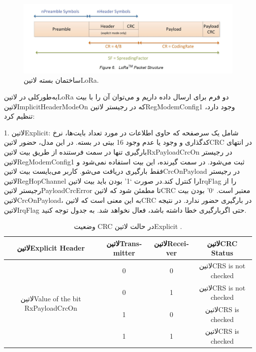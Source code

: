 \begin{figure}[!h]
	\centering
	\includegraphics[width=\linewidth]{Assets/lorapacket.png}
	\caption{ساختمان بسته ‌لاتین{LoRa}.}
	\label{fig:lorapacket}
\end{figure}
\noindent
به‌طورکلی در ‌لاتین{LoRa} دو فرم برای ارسال داده داریم و می‌توان آن را با بیت ‌لاتین{ImplicitHeaderModeOn} که در رجیستر ‌لاتین{RegModemConfig1} وجود دارد، تنظیم کرد:

1. ‌لاتین{Explicit}: شامل یک سرصفحه که حاوی اطلاعات در مورد تعداد بایت‌ها، نرخ کدگذاری و وجود یا عدم وجود  16 بیتی در بسته. در این مدل، حضور ‌لاتین{CRC} در انتهای بارگیری تنها در سمت فرستنده از طریق بیت ‌لاتین{RxPayloadCrcOn} در رجیستر ‌لاتین{RegModemConfig1} ثبت می‌شود. در سمت گیرنده، این بیت استفاده نمی‌شود و فقط بارگیری دریافت می‌شو. کاربر می‌بایست بیت ‌لاتین{CrcOnPayload} در رجیستر ‌لاتین{RegHopChannel} را کنترل کند.در صورت ‘1’ بودن باید بیت ‌لاتین{IrqFlag} را از رجیستر ‌لاتین{PayloadCrcError} تا مطمئن شود که ‌لاتین{CRC} معتبر است. ‘0’ بودن بیت ‌لاتین{CrcOnPayload}، به این معنی است که ‌لاتین{CRC} در بارگیری حضور ندارد. در نتیجه ‌لاتین{IrqFlag} حتی اگربارگیری خطا داشته باشد، فعال نخواهد شد. به جدول  توجه کنید.


\begin{table}[!h]
	\centering
	\caption{وضعیت CRC در حالت ‌لاتین{Explicit} .}
	\label{table:ExplicitCRC}
	\begin{latin}
		\begin{tabular}{|c|c|c|c|}
			\hline
			‌لاتین{Explicit Header} & ‌لاتین{Transmitter} & ‌لاتین{Receiver} & ‌لاتین{CRC Status}\\
			\hline
			\multirow{4}{7em}{‌لاتین{Value of the bit RxPayloadCrcOn}} & 0 & 0 & ‌لاتین{CRS is not checked}\\
			&	0 & 1 & ‌لاتین{CRS is not checked}\\
			&	1 & 0 & ‌لاتین{CRS is checked}\\
			&	1 & 1 & ‌لاتین{CRS is checked}\\
			\hline
		\end{tabular}
	\end{latin}
\end{table}


